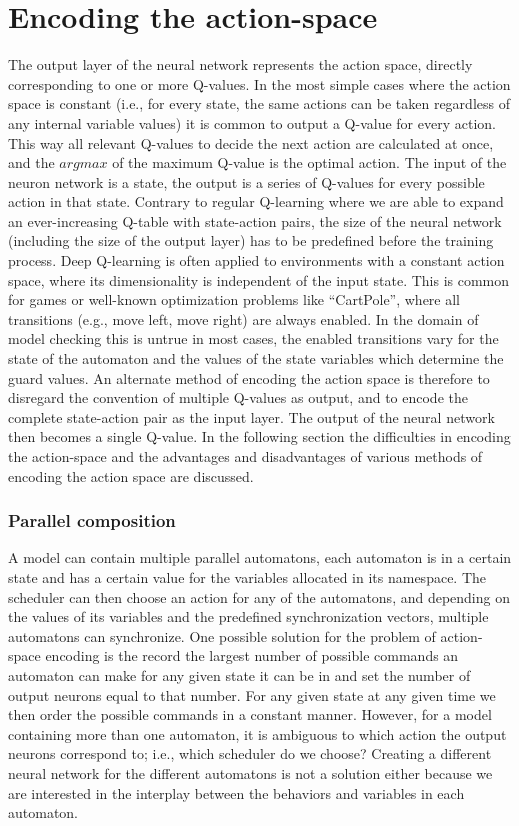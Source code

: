 \section{Encoding the action-space}
The output layer of the neural network represents the action space, directly corresponding to one or more Q-values. In the most simple cases where the action space is constant (i.e., for every state, the same actions can be taken regardless of any internal variable values) it is common to output a Q-value for every action. This way all relevant Q-values to decide the next action are calculated at once, and the $argmax$ of the maximum Q-value is the optimal action. The input of the neuron network is a state, the output is a series of Q-values for every possible action in that state.
Contrary to regular Q-learning where we are able to expand an ever-increasing Q-table with state-action pairs, the size of the neural network (including the size of the output layer) has to be predefined before the training process. Deep Q-learning is often applied to environments with a constant action space, where its dimensionality is independent of the input state. This is common for games or well-known optimization problems like ``CartPole'', where all transitions (e.g., move left, move right) are always enabled. In the domain of model checking this is untrue in most cases, the enabled transitions vary for the state of the automaton and the values of the state variables which determine the guard values. An alternate method of encoding the action space is therefore to disregard the convention of multiple Q-values as output, and to encode the complete state-action pair as the input layer. The output of the neural network then becomes a single Q-value. In the following section the difficulties in encoding the action-space and the advantages and disadvantages of various methods of encoding the action space are discussed.

\subsubsection{Parallel composition}
A model can contain multiple parallel automatons, each automaton is in a certain state and has a certain value for the variables allocated in its namespace. The scheduler can then choose an action for any of the automatons, and depending on the values of its variables and the predefined synchronization vectors, multiple automatons can synchronize. One possible solution for the problem of action-space encoding is the record the largest number of possible commands an automaton can make for any given state it can be in and set the number of output neurons equal to that number. For any given state at any given time we then order the possible commands in a constant manner. However, for a model containing more than one automaton, it is ambiguous to which action the output neurons correspond to; i.e., which scheduler do we choose? Creating a different neural network for the different automatons is not a solution either because we are interested in the interplay between the behaviors and variables in each automaton.

